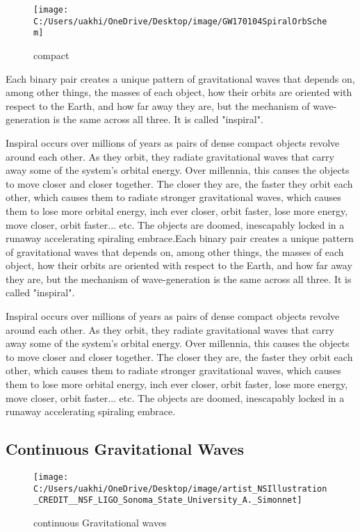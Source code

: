 \begin{figure}
	\centering
	\texttt{[image: C:/Users/uakhi/OneDrive/Desktop/image/GW170104SpiralOrbSchem]}
	\caption{compact}
	\label{fig:gw170104spiralorbschem}
\end{figure}


Each binary pair creates a unique pattern of gravitational waves that depends on, among other things, the masses of each object, how their orbits are oriented with respect to the Earth, and how far away they are, but the mechanism of wave-generation is the same across all three. It is called "inspiral".

Inspiral occurs over millions of years as pairs of dense compact objects revolve around each other. As they orbit, they radiate gravitational waves that carry away some of the system's orbital energy. Over  millennia, this causes the objects to move closer and closer together. The closer they are, the faster they orbit each other, which causes them to radiate stronger gravitational waves, which causes them to lose more orbital energy, inch ever closer, orbit faster, lose more energy, move closer, orbit faster... etc. The objects are doomed, inescapably locked in a runaway accelerating spiraling embrace.Each binary pair creates a unique pattern of gravitational waves that depends on, among other things, the masses of each object, how their orbits are oriented with respect to the Earth, and how far away they are, but the mechanism of wave-generation is the same across all three. It is called "inspiral".

Inspiral occurs over millions of years as pairs of dense compact objects revolve around each other. As they orbit, they radiate gravitational waves that carry away some of the system's orbital energy. Over  millennia, this causes the objects to move closer and closer together. The closer they are, the faster they orbit each other, which causes them to radiate stronger gravitational waves, which causes them to lose more orbital energy, inch ever closer, orbit faster, lose more energy, move closer, orbit faster... etc. The objects are doomed, inescapably locked in a runaway accelerating spiraling embrace.
\subsection{Continuous Gravitational Waves}
\begin{figure}
	\centering
	\texttt{[image: C:/Users/uakhi/OneDrive/Desktop/image/artist\_NSIllustration\_CREDIT\_\_NSF\_LIGO\_Sonoma\_State\_University\_A.\_Simonnet]}
	\caption{continuous Gravitational waves}
	\label{fig:artistnsillustrationcreditnsfligosonomastateuniversitya}
\end{figure}

